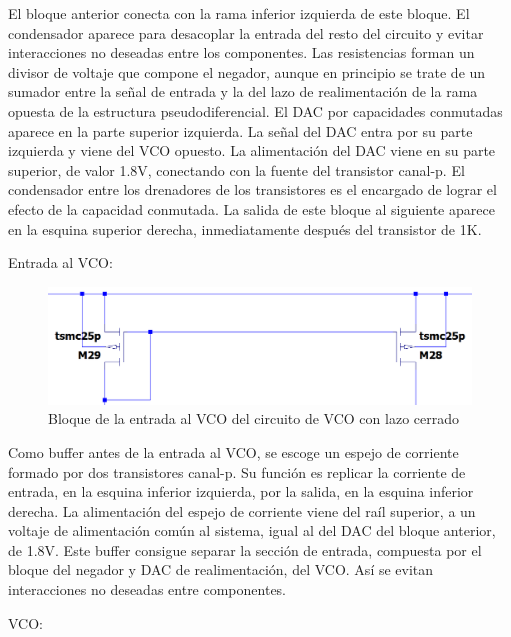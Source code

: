 \documentclass[12pt]{report} %
\begin{document}
	El bloque anterior conecta con la rama inferior izquierda de este bloque. El condensador aparece para desacoplar la entrada del resto del circuito y evitar interacciones no deseadas entre los componentes. Las resistencias forman un divisor de voltaje que compone el negador, aunque en principio se trate de un sumador entre la señal de entrada y la del lazo de realimentación de la rama opuesta de la estructura pseudodiferencial. El DAC por capacidades conmutadas aparece en la parte superior izquierda. La señal del DAC entra por su parte izquierda y viene del VCO opuesto. La alimentación del DAC viene en su parte superior, de valor 1.8V, conectando con la fuente del transistor canal-p. El condensador entre los drenadores de los transistores es el encargado de lograr el efecto de la capacidad conmutada. La salida de este bloque al siguiente aparece en la esquina superior derecha, inmediatamente después del transistor de 1K.
	
	Entrada al VCO:
	
	\begin{figure}[H]
		\includegraphics[width=\textwidth]{ltspice-vco-closed-current-mirror-block.png}
		\caption[Bloque de la entrada al VCO del circuito de VCO con lazo cerrado]{Bloque de la entrada al VCO del circuito de VCO con lazo cerrado}
		\label{fig:ltspice-vco-closed-current-mirror-block.png}
	\end{figure}

	Como buffer antes de la entrada al VCO, se escoge un espejo de corriente formado por dos transistores canal-p. Su función es replicar la corriente de entrada, en la esquina inferior izquierda, por la salida, en la esquina inferior derecha. La alimentación del espejo de corriente viene del raíl superior, a un voltaje de alimentación común al sistema, igual al del DAC del bloque anterior, de 1.8V. Este buffer consigue separar la sección de entrada, compuesta por el bloque del negador y DAC de realimentación, del VCO. Así se evitan interacciones no deseadas entre componentes.

	VCO:
		
\end{document}
